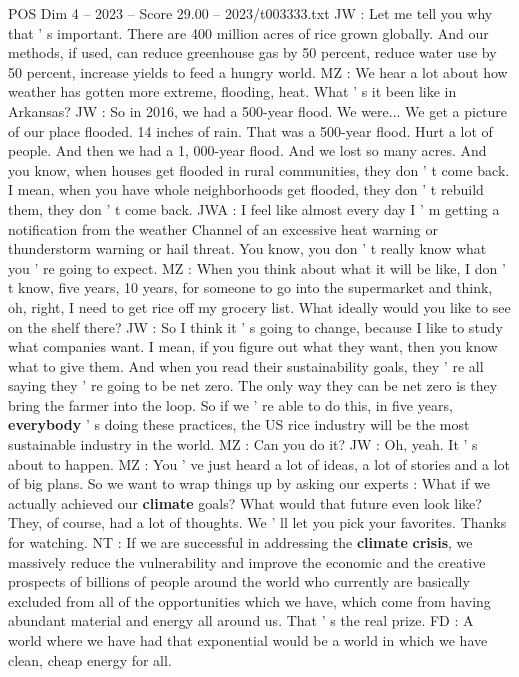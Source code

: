 \begin{textsample}{POS Dim 4 – 2023 – Score 29.00 – 2023/t003333.txt}
JW : Let me tell you why that ' s important.
There are 400 million acres of rice grown globally.
And our methods, if used, can reduce greenhouse gas by 50 percent, reduce water use by 50 percent, increase yields to feed a hungry world.
MZ : We hear a lot about how weather has gotten more extreme, flooding, heat.
What ' s it been like in Arkansas?
JW : So in 2016, we had a 500-year flood.
We were...
We get a picture of our place flooded. 14 inches of rain.
That was a 500-year flood.
Hurt a lot of people.
And then we had a 1, 000-year flood.
And we lost so many acres.
And you know, when houses get flooded in rural communities, they don ' t come back.
I mean, when you have whole neighborhoods get flooded, they don ' t rebuild them, they don ' t come back.
JWA : I feel like almost every day I ' m getting a notification from the weather Channel of an excessive heat warning or thunderstorm warning or hail threat.
You know, you don ' t really know what you ' re going to expect.
MZ : When you think about what it will be like, I don ' t know, five years, 10 years, for someone to go into the supermarket and think, oh, right, I need to get rice off my grocery list.
What ideally would you like to see on the shelf there?
JW : So I think it ' s going to change, because I like to study what companies want.
I mean, if you figure out what they want, then you know what to give them.
And when you read their sustainability goals, they ' re all saying they ' re going to be net zero.
The only way they can be net zero is they bring the farmer into the loop.
So if we ' re able to do this, in five years, \textbf{everybody} ' s doing these practices, the US rice industry will be the most sustainable industry in the world.
MZ : Can you do it?
JW : Oh, yeah.
It ' s about to happen.
MZ : You ' ve just heard a lot of ideas, a lot of stories and a lot of big plans.
So we want to wrap things up by asking our experts : What if we actually achieved our \textbf{climate} goals?
What would that future even look like?
They, of course, had a lot of thoughts.
We ' ll let you pick your favorites.
Thanks for watching.
NT : If we are successful in addressing the \textbf{climate} \textbf{crisis}, we massively reduce the vulnerability and improve the economic and the creative prospects of billions of people around the world who currently are basically excluded from all of the opportunities which we have, which come from having abundant material and energy all around us.
That ' s the real prize.
FD : A world where we have had that exponential would be a world in which we have clean, cheap energy for all.

\end{textsample}
